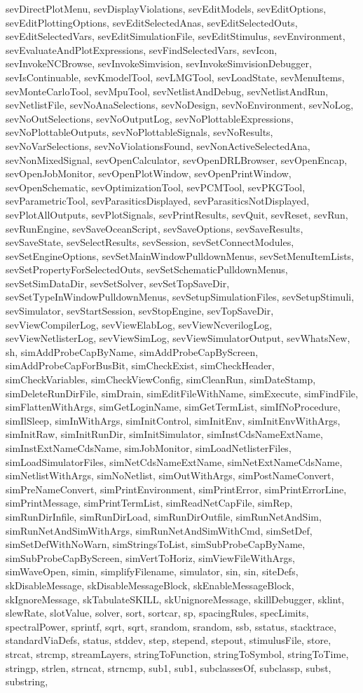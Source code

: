 {{sevDirectPlotMenu, sevDisplayViolations, sevEditModels, sevEditOptions, sevEditPlottingOptions, sevEditSelectedAnas, sevEditSelectedOuts, sevEditSelectedVars, sevEditSimulationFile, sevEditStimulus, sevEnvironment, sevEvaluateAndPlotExpressions, sevFindSelectedVars, sevIcon, sevInvokeNCBrowse, sevInvokeSimvision, sevInvokeSimvisionDebugger, sevIsContinuable, sevKmodelTool, sevLMGTool, sevLoadState, sevMenuItems, sevMonteCarloTool, sevMpuTool, sevNetlistAndDebug, sevNetlistAndRun, sevNetlistFile, sevNoAnaSelections, sevNoDesign, sevNoEnvironment, sevNoLog, sevNoOutSelections, sevNoOutputLog, sevNoPlottableExpressions, sevNoPlottableOutputs, sevNoPlottableSignals, sevNoResults, sevNoVarSelections, sevNoViolationsFound, sevNonActiveSelectedAna, sevNonMixedSignal, sevOpenCalculator, sevOpenDRLBrowser, sevOpenEncap, sevOpenJobMonitor, sevOpenPlotWindow, sevOpenPrintWindow, sevOpenSchematic, sevOptimizationTool, sevPCMTool, sevPKGTool, sevParametricTool, sevParasiticsDisplayed, sevParasiticsNotDisplayed, sevPlotAllOutputs, sevPlotSignals, sevPrintResults, sevQuit, sevReset, sevRun, sevRunEngine, sevSaveOceanScript, sevSaveOptions, sevSaveResults, sevSaveState, sevSelectResults, sevSession, sevSetConnectModules, sevSetEngineOptions, sevSetMainWindowPulldownMenus, sevSetMenuItemLists, sevSetPropertyForSelectedOuts, sevSetSchematicPulldownMenus, sevSetSimDataDir, sevSetSolver, sevSetTopSaveDir, sevSetTypeInWindowPulldownMenus, sevSetupSimulationFiles, sevSetupStimuli, sevSimulator, sevStartSession, sevStopEngine, sevTopSaveDir, sevViewCompilerLog, sevViewElabLog, sevViewNcverilogLog, sevViewNetlisterLog, sevViewSimLog, sevViewSimulatorOutput, sevWhatsNew, sh, simAddProbeCapByName, simAddProbeCapByScreen, simAddProbeCapForBusBit, simCheckExist, simCheckHeader, simCheckVariables, simCheckViewConfig, simCleanRun, simDateStamp, simDeleteRunDirFile, simDrain, simEditFileWithName, simExecute, simFindFile, simFlattenWithArgs, simGetLoginName, simGetTermList, simIfNoProcedure, simIlSleep, simInWithArgs, simInitControl, simInitEnv, simInitEnvWithArgs, simInitRaw, simInitRunDir, simInitSimulator, simInstCdsNameExtName, simInstExtNameCdsName, simJobMonitor, simLoadNetlisterFiles, simLoadSimulatorFiles, simNetCdsNameExtName, simNetExtNameCdsName, simNetlistWithArgs, simNoNetlist, simOutWithArgs, simPostNameConvert, simPreNameConvert, simPrintEnvironment, simPrintError, simPrintErrorLine, simPrintMessage, simPrintTermList, simReadNetCapFile, simRep, simRunDirInfile, simRunDirLoad, simRunDirOutfile, simRunNetAndSim, simRunNetAndSimWithArgs, simRunNetAndSimWithCmd, simSetDef, simSetDefWithNoWarn, simStringsToList, simSubProbeCapByName, simSubProbeCapByScreen, simVertToHoriz, simViewFileWithArgs, simWaveOpen, simin, simplifyFilename, simulator, sin, sin, siteDefs, skDisableMessage, skDisableMessageBlock, skEnableMessageBlock, skIgnoreMessage, skTabulateSKILL, skUnignoreMessage, skillDebugger, sklint, slewRate, slotValue, solver, sort, sortcar, sp, spacingRules, specLimits, spectralPower, sprintf, sqrt, sqrt, srandom, srandom, ssb, sstatus, stacktrace, standardViaDefs, status, stddev, step, stepend, stepout, stimulusFile, store, strcat, strcmp, streamLayers, stringToFunction, stringToSymbol, stringToTime, stringp, strlen, strncat, strncmp, sub1, sub1, subclassesOf, subclassp, subst, substring, }}
